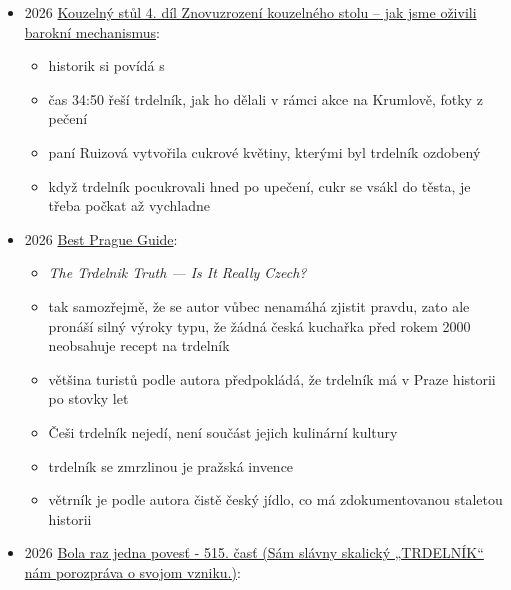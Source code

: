 \begin{itemize}
  \begin{itemize}
  \tightlist
  \item
    \emph{Traditional?}
  \item
    článek, kde popisujou jak byly preclíky v turistopasťovejch
    restauracích nahrazený stánkama s trdelníkem
  \item
    a pak samozřejmě klasický klišé o tom, jak je trdleník vlastně
    kurtoskalács
  \end{itemize}
\item
  2026
  \href{https://www.youtube.com/watch?v=yH2Z5MORERw&list=PLfEGH366gTiXZUsWNilOS5J04rPPnn9sN}{Kouzelný
  stůl 4. díl \textbar{} Znovuzrození kouzelného stolu -- jak jsme
  oživili barokní mechanismus}:

  \begin{itemize}
  \tightlist
  \item
    historik  si povídá s
  \item
    čas 34:50 řeší trdelník, jak ho dělali v rámci akce na Krumlově,
    fotky z pečení
  \item
    paní Ruizová vytvořila cukrové květiny, kterými byl trdelník
    ozdobený
  \item
    když trdelník pocukrovali hned po upečení, cukr se vsákl do těsta,
    je třeba počkat až vychladne
  \end{itemize}
\item
  2026 \href{https://bestpragueguide.com/en/blog/trdelnik-truth}{Best
  Prague Guide}:

  \begin{itemize}
  \tightlist
  \item
    \emph{The Trdelnik Truth --- Is It Really Czech?}
  \item
    tak samozřejmě, že se autor vůbec nenamáhá zjistit pravdu, zato ale
    pronáší silný výroky typu, že žádná česká kuchařka před rokem 2000
    neobsahuje recept na trdelník
  \item
    většina turistů podle autora předpokládá, že trdelník má v Praze
    historii po stovky let
  \item
    Češi trdelník nejedí, není součást jejich kulinární kultury
  \item
    trdelník se zmrzlinou je pražská invence
  \item
    větrník je podle autora čistě český jídlo, co má zdokumentovanou
    staletou historii
  \end{itemize}
\item
  2026
  \href{https://slovensko.stvr.sk/rubriky/aktualne-rubriky/bola-raz-jedna-povest/441454/bola-raz-jedna-povest-515-cast-sam-slavny-skalicky-trdelnik-nam-porozprava-o-svojom-vzniku}{Bola
  raz jedna povesť - 515. časť (Sám slávny skalický „TRDELNÍK`` nám
  porozpráva o svojom vzniku.)}:


\end{itemize}
